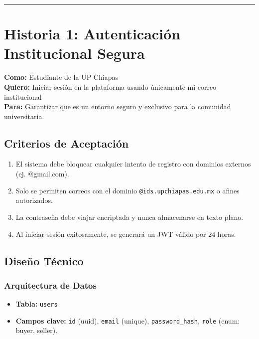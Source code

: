 \documentclass[11pt, letterpaper]{article}
\begin{document}
    \vspace{1em}
    \hrule
    \vspace{2em}
   
    \section{Historia 1: Autenticación Institucional Segura}
   
    \begin{tcolorbox}[colback=purple!5!white,colframe=purple!75!black,title=HU-01: Acceso Exclusivo]
        \textbf{Como:} Estudiante de la UP Chiapas \\
        \textbf{Quiero:} Iniciar sesión en la plataforma usando únicamente mi correo institucional \\
        \textbf{Para:} Garantizar que es un entorno seguro y exclusivo para la comunidad universitaria.
    \end{tcolorbox}
   
    \subsection{Criterios de Aceptación}
    \begin{enumerate}[label=\bfseries\arabic*.]
        \item El sistema debe bloquear cualquier intento de registro con dominios externos (ej. @gmail.com).
        \item Solo se permiten correos con el dominio \texttt{@ids.upchiapas.edu.mx} o afines autorizados.
        \item La contraseña debe viajar encriptada y nunca almacenarse en texto plano.
        \item Al iniciar sesión exitosamente, se generará un JWT válido por 24 horas.
    \end{enumerate}
   
    \subsection{Diseño Técnico}
    \subsubsection*{Arquitectura de Datos}
    \begin{itemize}
        \item \textbf{Tabla:} \texttt{users}
        \item \textbf{Campos clave:} \texttt{id} (uuid), \texttt{email} (unique), \texttt{password\_hash}, \texttt{role} (enum: buyer, seller).
    \end{itemize}
   
\end{document}
